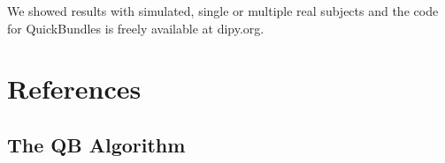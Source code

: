 \documentclass[preprint,authoryear,a4paper,10pt,onecolumn]{elsarticle}
\begin{document}
We showed results with simulated, single or multiple real subjects
and the code for QuickBundles is freely available at dipy.org.

\section{References}

%



\begin{appendices}

\section{The QB Algorithm\label{Sec:QB-Algorithm}}


\end{appendices}
\end{document}
